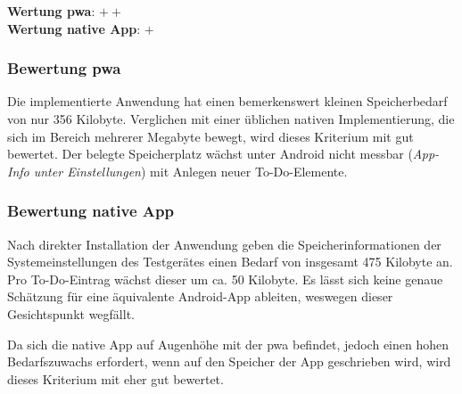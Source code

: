 \textbf{Wertung \ac{pwa}}: $++$ \\
\textbf{Wertung native App}: $+$ \\

\subsubsection{Bewertung \ac{pwa}}
Die implementierte Anwendung hat einen bemerkenswert kleinen Speicherbedarf von nur 356 Kilobyte. Verglichen mit einer üblichen nativen Implementierung, die sich im Bereich mehrerer Megabyte bewegt, wird dieses Kriterium mit gut bewertet.
Der belegte Speicherplatz wächst unter Android nicht messbar (\textit{App-Info unter Einstellungen}) mit Anlegen neuer To-Do-Elemente.

\subsubsection{Bewertung native App}
Nach direkter Installation der Anwendung geben die Speicherinformationen der Systemeinstellungen des Testgerätes einen Bedarf von insgesamt 475 Kilobyte an. Pro To-Do-Eintrag wächst dieser um ca. 50 Kilobyte. Es lässt sich keine genaue Schätzung für eine äquivalente Android-App ableiten, weswegen dieser Gesichtspunkt wegfällt.

Da sich die native App auf Augenhöhe mit der \ac{pwa} befindet, jedoch einen hohen Bedarfszuwachs erfordert, wenn auf den Speicher der App geschrieben wird, wird dieses Kriterium mit eher gut bewertet.